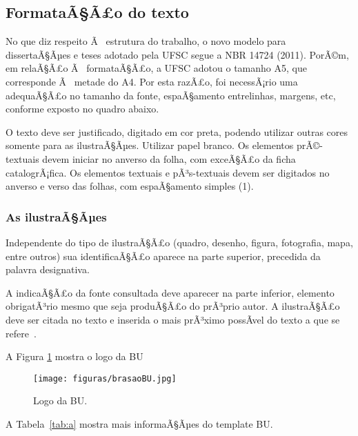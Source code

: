 \documentclass{ufscThesis} %
\begin{document}
\subsection{FormataÃ§Ã£o do texto}

No que diz respeito Ã  estrutura do trabalho, o novo modelo para dissertaÃ§Ãµes e teses adotado pela UFSC segue a NBR 14724 (2011). PorÃ©m, em relaÃ§Ã£o Ã  formataÃ§Ã£o, a UFSC adotou o tamanho A5, que corresponde Ã  metade do A4. Por esta razÃ£o, foi necessÃ¡rio uma adequaÃ§Ã£o no tamanho da fonte, espaÃ§amento entrelinhas, margens, etc, conforme exposto no quadro abaixo.

O texto deve ser justificado, digitado em cor preta, podendo utilizar outras cores somente para as ilustraÃ§Ãµes. Utilizar papel branco. Os elementos prÃ©-textuais devem iniciar no anverso da folha, com  exceÃ§Ã£o da ficha catalogrÃ¡fica. Os elementos textuais e pÃ³s-textuais devem ser digitados no anverso e verso das folhas, com espaÃ§amento simples (1). 



\subsubsection{As ilustraÃ§Ãµes}

Independente do tipo de ilustraÃ§Ã£o (quadro, desenho, figura, fotografia, mapa, entre outros) sua identificaÃ§Ã£o aparece na parte superior, precedida da palavra designativa. 



A indicaÃ§Ã£o da fonte consultada deve aparecer na parte inferior, elemento obrigatÃ³rio mesmo que seja produÃ§Ã£o do prÃ³prio autor. A ilustraÃ§Ã£o deve ser citada no texto e inserida o mais prÃ³ximo possÃ­vel do texto a que se refere~\cite{abnt14724}. 

A Figura \ref{fig:a} mostra o logo da BU
\begin{figure}[!htb]
   \centering
   \caption{Logo da BU.}\label{fig:a}
   \texttt{[image: figuras/brasaoBU.jpg]}
\end{figure}

A Tabela~\ref{tab:a} mostra mais informaÃ§Ãµes do template BU.
\end{document}
